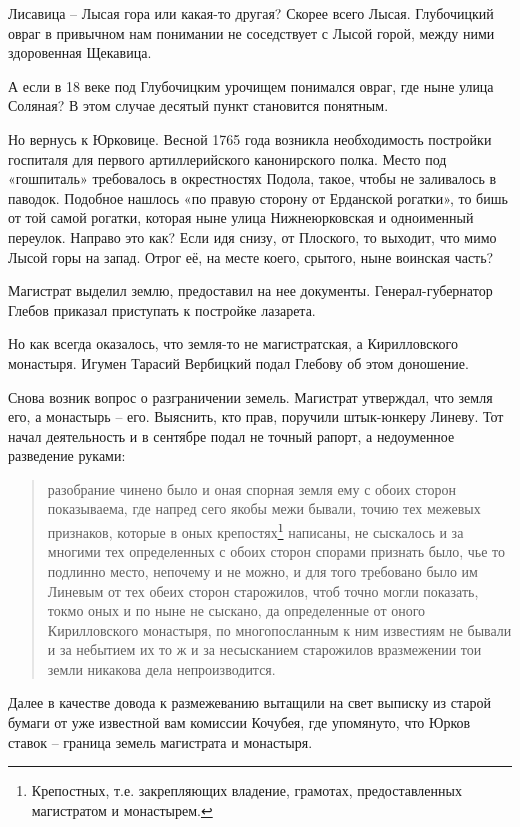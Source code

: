 Лисавица – Лысая гора или какая-то другая? Скорее всего Лысая. Глубочицкий овраг в привычном нам понимании не соседствует с Лысой горой, между ними здоровенная Щекавица. 

А если в 18 веке под Глубочицким урочищем понимался овраг, где ныне улица Соляная? В этом случае десятый пункт становится понятным.

Но вернусь к Юрковице. Весной 1765 года возникла необходимость постройки госпиталя для первого артиллерийского канонирского полка. Место под «гошпиталь» требовалось в окрестностях Подола, такое, чтобы не заливалось в паводок. Подобное нашлось «по правую сторону от Ерданской рогатки», то бишь от той самой рогатки, которая ныне улица Нижнеюрковская и одноименный переулок. Направо это как? Если идя снизу, от Плоского, то выходит, что мимо Лысой горы на запад. Отрог её, на месте коего, срытого, ныне воинская часть?

Магистрат выделил землю, предоставил на нее документы. Генерал-губернатор Глебов приказал приступать к постройке лазарета.

Но как всегда оказалось, что земля-то не магистратская, а Кирилловского монастыря. Игумен Тарасий Вербицкий подал Глебову об этом доношение.

Снова возник вопрос о разграничении земель. Магистрат утверждал, что земля его, а монастырь – его. Выяснить, кто прав, поручили штык-юнкеру Линеву. Тот начал деятельность и в сентябре подал не точный рапорт, а недоуменное разведение руками:

\begin{quotation}
разобрание чинено было и оная спорная земля ему с обоих сторон показываема, где напред сего якобы межи бывали, точию тех межевых признаков, которые в оных крепостях\footnote{Крепостных, т.е. закрепляющих владение, грамотах, предоставленных магистратом и монастырем.} написаны, не сыскалось и за многими тех определенных с обоих сторон спорами признать было, чье то подлинно место, непочему и не можно, и для того требовано было им Линевым от тех обеих сторон старожилов, чтоб точно могли показать, токмо оных и по ныне не сыскано, да определенные от оного Кирилловского монастыря, по многопосланным к ним известиям не бывали и за небытием их то ж и за несысканием старожилов вразмежении тои земли никакова дела непроизводится.
\end{quotation}

Далее в качестве довода к размежеванию вытащили на свет выписку из старой бумаги от уже известной вам комиссии Кочубея, где упомянуто, что Юрков ставок – граница земель магистрата и монастыря.


